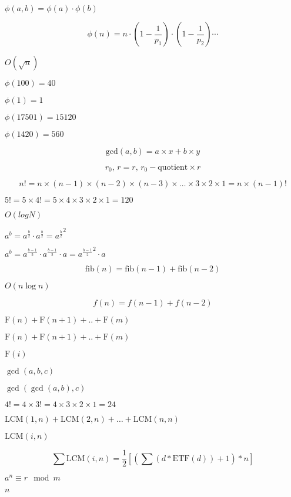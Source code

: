 \documentclass{article}
\begin{document}
$\phi(a,b) = \phi(a)\cdot\phi(b)$
\pagebreak

\[\phi(n) =
n\cdot\left(1-\frac{1}{p_1}\right)\cdot\left(1-\frac{1}{p_2}\right)\cdots\]
\pagebreak

$O\left(\sqrt{n}\right)$
\pagebreak

$\phi(100) = 40$
\pagebreak

$\phi(1) = 1$
\pagebreak

$\phi(17501) = 15120$
\pagebreak

$\phi(1420) = 560$
\pagebreak

\[\text{gcd}(a, b) = a \times x + b \times y \]
\pagebreak

\[r_0,\,r = r,\, r_0 - \text{quotient}\times r\]
\pagebreak

\[n! = n\times(n-1)\times(n-2)\times(n-3)\times\ldots\times3\times2\times1
      = n\times(n-1)!\]
\pagebreak

$5! = 5\times4! = 5\times4\times3\times2\times1 = 120$
\pagebreak

$O(logN)$
\pagebreak

$a^b = a^\frac{b}{2} \cdot a^\frac{b}{2} = {a^\frac{b}{2}}^2$
\pagebreak

$a^b = a^\frac{b-1}{2}
 \cdot a^\frac{b-1}{2} \cdot a = {a^\frac{b-1}{2}}^2 \cdot a$
\pagebreak

\[\text{fib}(n) = \text{fib}(n-1) + \text{fib}(n-2)\]
\pagebreak

$O(n\log n)$
\pagebreak

\[f(n)=f(n-1)+f(n-2)\]
\pagebreak

$\mathrm{F}(n) +
\mathrm{F}(n+1) + .. + \mathrm{F}(m)$
\pagebreak

$\mathrm{F}(n) + \mathrm{F}(n+1) + .. + \mathrm{F}(m)$
\pagebreak

$\mathrm{F}(i)$
\pagebreak

$\gcd(a, b, c)$
\pagebreak

$\gcd(\gcd(a, b), c)$
\pagebreak

$4! = 4\times3! = 4\times3\times2\times1 = 24$
\pagebreak

$\mathrm{LCM}(1,n) +
\mathrm{LCM}(2,n) + \ldots + \mathrm{LCM}(n,n)$
\pagebreak

$\mathrm{LCM}(i,n)$
\pagebreak

\[ \sum\mathrm{LCM}(i, n) = \frac{1}{2} \left[\left(\sum (d *
\mathrm{ETF}(d)) + 1\right) * n\right] \]
\pagebreak

$a^{n} \equiv r \mod{m}$
\pagebreak

$n$
\pagebreak
\end{document}
